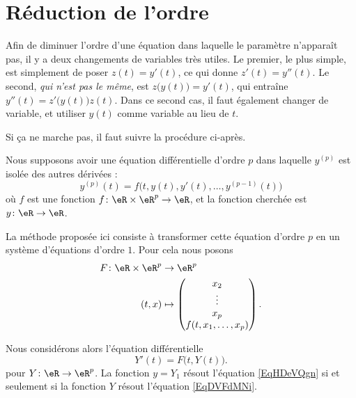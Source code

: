 \section{Réduction de l'ordre}
\label{SecWGdleRM}

Afin de diminuer l'ordre d'une équation dans laquelle le paramètre n'apparaît pas, il y a deux changements de variables très utiles. Le premier, le plus simple, est simplement de poser \( z(t)=y'(t)\), ce qui donne \( z'(t)=y''(t)\). Le second, \emph{qui n'est pas le même}, est \( z\big( y(t) \big)=y'(t)\), qui entraîne \( y''(t)=z'\big( y(t) \big)z(t)\). Dans ce second cas, il faut également changer de variable, et utiliser \( y(t)\) comme variable au lieu de \( t\).


Si ça ne marche pas, il faut suivre la procédure ci-après.

Nous supposons avoir une équation différentielle d'ordre \( p\) dans laquelle \( y^{(p)}\) est isolée des autres dérivées :
\begin{equation}    \label{EqHDeVQgn}
	y^{(p)}(t)=f\big( t,y(t),y'(t),\ldots, y^{(p-1)}(t) \big)
\end{equation}
où \( f\) est une fonction \( f\colon \eR\times \eR^p\to \eR\), et la fonction cherchée est \( y\colon \eR\to \eR\).

La méthode proposée ici consiste à transformer cette équation d'ordre \( p\) en un système d'équations d'ordre \( 1\). Pour cela nous posons
\begin{equation}
	\begin{aligned}
		F\colon \eR\times \eR^p & \to \eR^p                   \\
		(t,x)                   & \mapsto \begin{pmatrix}
			                                  x_2    \\
			                                  \vdots \\
			                                  x_p    \\
			                                  f(t,x_1,\ldots, x_p)
		                                  \end{pmatrix}.
	\end{aligned}
\end{equation}

Nous considérons alors l'équation différentielle
\begin{equation}    \label{EqDVFdMNi}
	Y'(t)=F\big( t,Y(t) \big).
\end{equation}
pour \( Y\colon \eR\to  \eR^p\). La fonction \( y=Y_1\) résout l'équation \eqref{EqHDeVQgn} si et seulement si la fonction \( Y\) résout l'équation \eqref{EqDVFdMNi}.

